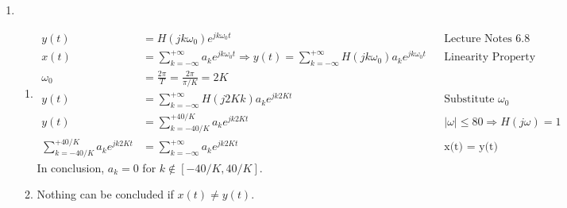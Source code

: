 \documentclass[10pt,a4paper, margin=1in]{article}
\begin{document}
\begin{enumerate}
\item %
    \begin{enumerate}
    \item 
    \begin{align*}
        y(t) &= H(jk\omega_0) e^{jk\omega_0t} &&\text{Lecture Notes 6.8}\\
        x(t) &= \sum_{k=-\infty}^{+\infty} a_k e^{jk\omega_0t} \Rightarrow y(t) = \sum_{k=-\infty}^{+\infty}H(jk\omega_0) a_k e^{jk\omega_0t} && \text{Linearity Property}\\
        \omega_0 &= \frac{2\pi}{T} = \frac{2\pi}{\pi/K} = 2K\\
        y(t) &= \sum_{k=-\infty}^{+\infty}H(j2Kk) a_k e^{jk2Kt} && \text{Substitute $\omega_0$}\\
        y(t) &= \sum_{k=-40/K}^{+40/K} a_k e^{jk2Kt} && |\omega| \leq 80 \Rightarrow H(j\omega) = 1 \\
        \sum_{k=-40/K}^{+40/K} a_k e^{jk2Kt} &= \sum_{k=-\infty}^{+\infty} a_k e^{jk2Kt} && \text{x(t) = y(t)}
    \end{align*}
    In conclusion, $a_k = 0$ for $k \notin [-40/K, 40/K]$.
    \item Nothing can be concluded if $x(t) \neq y(t)$.
    \end{enumerate}    
	

\end{enumerate}
\end{document}
